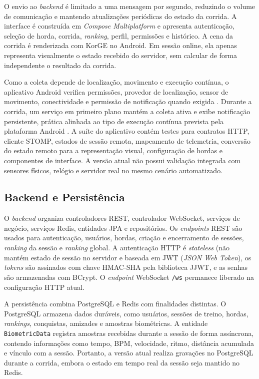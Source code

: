 O envio ao \textit{backend} é limitado a uma mensagem por segundo, reduzindo o volume de comunicação e mantendo atualizações periódicas do estado da corrida. A interface é construída em \textit{Compose Multiplatform} e apresenta autenticação, seleção de horda, corrida, \textit{ranking}, perfil, permissões e histórico. A cena da corrida é renderizada com KorGE no Android. Em sessão online, ela apenas representa visualmente o estado recebido do servidor, sem calcular de forma independente o resultado da corrida.

Como a coleta depende de localização, movimento e execução contínua, o aplicativo Android verifica permissões, provedor de localização, sensor de movimento, conectividade e permissão de notificação quando exigida \cite{androidLocationPermissions, androidLocationSettings}. Durante a corrida, um serviço em primeiro plano mantém a coleta ativa e exibe notificação persistente, prática alinhada ao tipo de execução contínua prevista pela plataforma Android \cite{androidForegroundServices, androidForegroundServiceTypes}. A suíte do aplicativo contém testes para contratos HTTP, cliente STOMP, estados de sessão remota, mapeamento de telemetria, conversão do estado remoto para a representação visual, configuração de hordas e componentes de interface. A versão atual não possui validação integrada com sensores físicos, relógio e servidor real no mesmo cenário automatizado.

\subsection{Backend e Persistência}

O \textit{backend} organiza controladores REST, controlador WebSocket, serviços de negócio, serviços Redis, entidades JPA e repositórios. Os \textit{endpoints} REST são usados para autenticação, usuários, hordas, criação e encerramento de sessões, \textit{ranking} da sessão e \textit{ranking} global. A autenticação HTTP é \textit{stateless} (não mantém estado de sessão no servidor e baseada em JWT (\textit{JSON Web Token}), os \textit{tokens} são assinados com chave HMAC-SHA pela biblioteca JJWT, e as senhas são armazenadas com BCrypt. O \textit{endpoint} WebSocket \texttt{/ws} permanece liberado na configuração HTTP atual.

A persistência combina PostgreSQL e Redis com finalidades distintas. O PostgreSQL armazena dados duráveis, como usuários, sessões de treino, hordas, \textit{rankings}, conquistas, amizades e amostras biométricas. A entidade \texttt{BiometricData} registra amostras recebidas durante a sessão de forma assíncrona, contendo informações como tempo, BPM, velocidade, ritmo, distância acumulada e vínculo com a sessão. Portanto, a versão atual realiza gravações no PostgreSQL durante a corrida, embora o estado em tempo real da sessão seja mantido no Redis.


